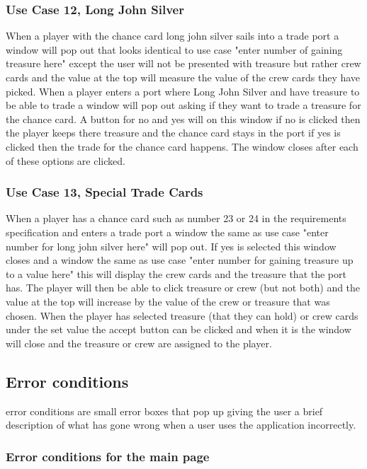 \documentclass{article}
\begin{document}
\subsubsection{Use Case 12, Long John Silver}

When a player with the chance card long john silver sails into a trade port a window will pop out that looks identical to use case "enter number of gaining treasure here"
except the user will not be presented with treasure but rather crew cards and the value at the top will measure the value of the crew cards they have picked. When a player
enters a port where Long John Silver and have treasure to be able to trade a window will pop out asking if they want to trade a treasure for the chance card. A button for
no and yes will on this window if no is clicked then the player keeps there treasure and the chance card stays in the port if yes is clicked then the trade for the chance
card happens. The window closes after each of these options are clicked. 



\subsubsection{Use Case 13, Special Trade Cards}

When a player has a chance card such as number 23 or 24 in the requirements specification and enters a trade port a window the same as use case "enter number for long john silver here"
will pop out. If yes is selected this window closes and a window the same as use case "enter number for gaining treasure up to a value here" this will display the 
crew cards and the treasure that the port has. The player will then be able to click treasure or crew (but not both) and the value at the top will increase 
by the value of the crew or treasure that was chosen. When the player has selected treasure (that they can hold) or crew cards under the set value the accept button
can be clicked and when it is the window will close and the treasure or crew are assigned to the player.


	\subsection{Error conditions}
	error conditions are small error boxes that pop up giving the user a brief description of what has gone wrong when a user uses the application incorrectly.
	\subsubsection{Error conditions for the main page}
	
\end{document}
